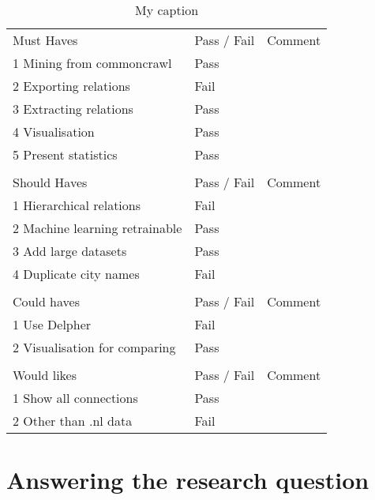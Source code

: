 \begin{table}[h]
\centering
\caption{My caption}
\label{my-label}
\begin{tabular}{lll}
Must Haves                     & Pass / Fail & Comment \\
1 Mining from commoncrawl      & Pass        &         \\
2 Exporting relations          & Fail        &         \\
3 Extracting relations         & Pass        &         \\
4 Visualisation                & Pass        &         \\
5 Present statistics           & Pass        &         \\
                               &             &         \\
Should Haves                   & Pass / Fail & Comment \\
1 Hierarchical relations       & Fail        &         \\
2 Machine learning retrainable & Pass        &         \\
3 Add large datasets           & Pass        &         \\
4 Duplicate city names         & Fail        &         \\
                               &             &         \\
Could haves                    & Pass / Fail & Comment \\
1 Use Delpher                  & Fail        &         \\
2 Visualisation for comparing  & Pass        &         \\
                               &             &         \\
Would likes                    & Pass / Fail & Comment \\
1 Show all connections         & Pass        &         \\
2 Other than .nl data          & Fail        &        
\end{tabular}
\end{table}

\section{Answering the research question}


